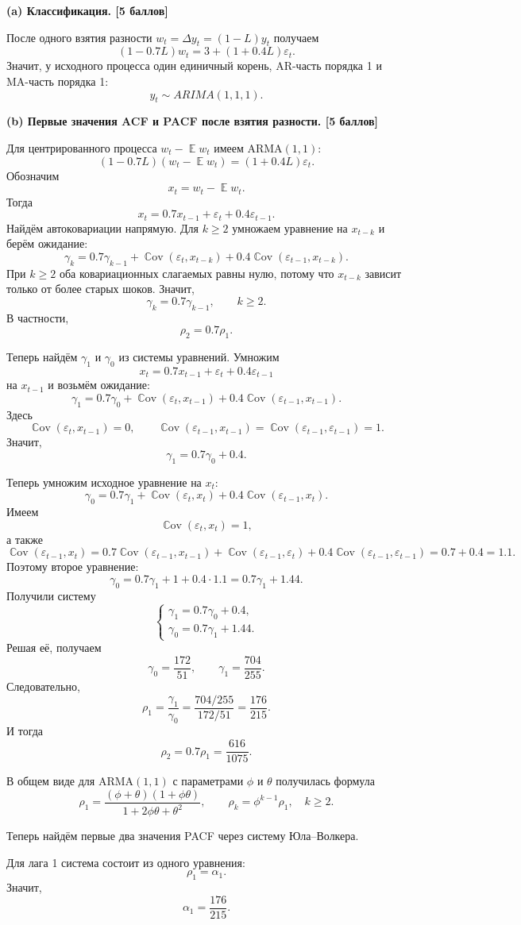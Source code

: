 \documentclass[12pt]{article}
\DeclareMathOperator{\Cov}{\mathbb{C}ov}
\DeclareMathOperator{\E}{\mathbb{E}}
\newcommand \e{\varepsilon}
\newcommand{\step}[1]{\medskip\noindent\textbf{#1}\par\nobreak\vspace{2pt}}
\begin{document}
\step{(a) Классификация. \hfill [5 баллов]}
После одного взятия разности $w_t=\Delta y_t=(1-L)y_t$ получаем
\[
(1-0.7L)w_t=3+(1+0.4L)\e_t.
\]
Значит, у исходного процесса один единичный корень, AR-часть порядка 1 и MA-часть порядка 1:
\[
\boxed{y_t\sim ARIMA(1,1,1).}
\]

\step{(b) Первые значения ACF и PACF после взятия разности. \hfill [5 баллов]}
Для центрированного процесса $w_t-\E w_t$ имеем ARMA$(1,1)$:
\[
(1-0.7L)(w_t-\E w_t)=(1+0.4L)\e_t.
\]
Обозначим
\[
x_t=w_t-\E w_t.
\]
Тогда
\[
x_t=0.7x_{t-1}+\e_t+0.4\e_{t-1}.
\]
Найдём автоковариации напрямую. Для $k\ge 2$ умножаем уравнение на $x_{t-k}$ и берём ожидание:
\[
\gamma_k=0.7\gamma_{k-1}
+\Cov(\e_t,x_{t-k})+0.4\Cov(\e_{t-1},x_{t-k}).
\]
При $k\ge 2$ оба ковариационных слагаемых равны нулю, потому что $x_{t-k}$ зависит только от более старых шоков. Значит,
\[
\gamma_k=0.7\gamma_{k-1},\qquad k\ge 2.
\]
В частности,
\[
\rho_2=0.7\rho_1.
\]

Теперь найдём $\gamma_1$ и $\gamma_0$ из системы уравнений. Умножим
\[
x_t=0.7x_{t-1}+\e_t+0.4\e_{t-1}
\]
на $x_{t-1}$ и возьмём ожидание:
\[
\gamma_1=0.7\gamma_0+\Cov(\e_t,x_{t-1})+0.4\Cov(\e_{t-1},x_{t-1}).
\]
Здесь
\[
\Cov(\e_t,x_{t-1})=0,
\qquad
\Cov(\e_{t-1},x_{t-1})=\Cov(\e_{t-1},\e_{t-1})=1.
\]
Значит,
\[
\gamma_1=0.7\gamma_0+0.4.
\]

Теперь умножим исходное уравнение на $x_t$:
\[
\gamma_0=0.7\gamma_1+\Cov(\e_t,x_t)+0.4\Cov(\e_{t-1},x_t).
\]
Имеем
\[
\Cov(\e_t,x_t)=1,
\]
а также
\[
\Cov(\e_{t-1},x_t)
=0.7\Cov(\e_{t-1},x_{t-1})+\Cov(\e_{t-1},\e_t)
+0.4\Cov(\e_{t-1},\e_{t-1})
=0.7+0.4=1.1.
\]
Поэтому второе уравнение:
\[
\gamma_0=0.7\gamma_1+1+0.4\cdot 1.1
=0.7\gamma_1+1.44.
\]
Получили систему
\[
\begin{cases}
\gamma_1=0.7\gamma_0+0.4,\\
\gamma_0=0.7\gamma_1+1.44.
\end{cases}
\]
Решая её, получаем
\[
\gamma_0=\frac{172}{51},\qquad \gamma_1=\frac{704}{255}.
\]
Следовательно,
\[
\rho_1=\frac{\gamma_1}{\gamma_0}
=\frac{704/255}{172/51}
=\frac{176}{215}.
\]
И тогда
\[
\rho_2=0.7\rho_1=\frac{616}{1075}.
\]

В общем виде для ARMA$(1,1)$ с параметрами $\phi$ и $\theta$ получилась формула
\[
\rho_1=\frac{(\phi+\theta)(1+\phi\theta)}{1+2\phi\theta+\theta^2},
\qquad
\rho_k=\phi^{k-1}\rho_1,\quad k\ge 2.
\]

Теперь найдём первые два значения PACF через систему Юла--Волкера.

Для лага 1 система состоит из одного уравнения:
\[
\rho_1=\alpha_1.
\]
Значит,
\[
\alpha_1=\frac{176}{215}.
\]
\end{document}
